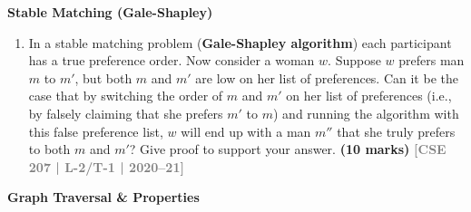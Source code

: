 \documentclass[12pt,a3paper]{article}
\newcommand{\yr}[1]{\hfill\textcolor{gray}{\small\textbf{[#1]}}}
\newcommand{\mk}[1]{\textcolor{orange!70!black}{\small\textbf{(#1 marks)}}}
\newcommand{\subtopic}[2]{%
  \vspace{10pt}
  \noindent\begin{tcolorbox}[colback=#1!8,colframe=#1,boxrule=0.6pt,arc=4pt,
    left=6pt,right=6pt,top=4pt,bottom=4pt]
    \small\bfseries\textcolor{#1}{#2}
  \end{tcolorbox}
  \vspace{2pt}
}
\begin{document}
\subtopic{cA}{Stable Matching (Gale-Shapley)}
\label{sub:s1-stablematching}

\begin{enumerate}
  \item In a stable matching problem (\textbf{Gale-Shapley algorithm}) each participant has a true preference order. Now consider a woman $w$. Suppose $w$ prefers man $m$ to $m'$, but both $m$ and $m'$ are low on her list of preferences. Can it be the case that by switching the order of $m$ and $m'$ on her list of preferences (i.e., by falsely claiming that she prefers $m'$ to $m$) and running the algorithm with this false preference list, $w$ will end up with a man $m''$ that she truly prefers to both $m$ and $m'$? Give proof to support your answer.
  \mk{10}  \yr{CSE 207 | L-2/T-1 | 2020--21}
\end{enumerate}


\subtopic{cA}{Graph Traversal \& Properties}
\label{sub:s1-traversal}
\end{document}
